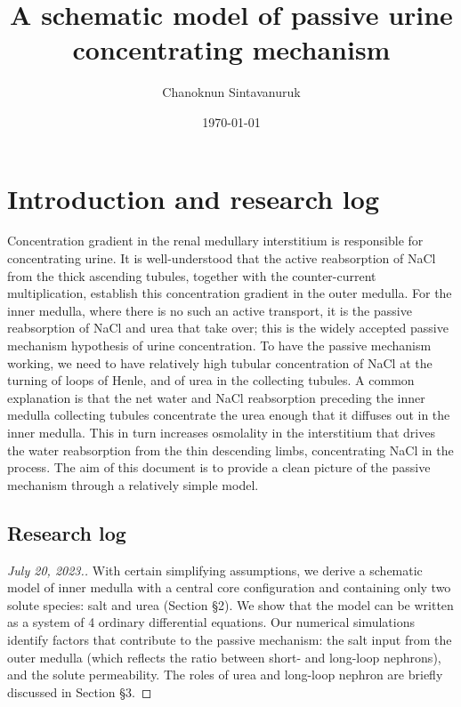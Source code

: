 \documentclass{article}
\title{A schematic model of passive urine concentrating mechanism}
\author[1]{Chanoknun Sintavanuruk}
\date{\today}
\numberwithin{equation}{section} %
\begin{document}
\sloppy %
\maketitle

\section{Introduction and research log}

Concentration gradient in the renal medullary interstitium is responsible for concentrating urine.
It is well-understood that the active reabsorption of NaCl from the thick ascending tubules, together with the counter-current multiplication, establish this concentration gradient in the outer medulla.
For the inner medulla, where there is no such an active transport, it is the passive reabsorption of NaCl and urea that take over; this is the widely accepted passive mechanism hypothesis of urine concentration.
To have the passive mechanism working, we need to have relatively high tubular concentration of NaCl at the turning of loops of Henle, and of urea in the collecting tubules.
A common explanation is that the net water and NaCl reabsorption preceding the inner medulla collecting tubules concentrate the urea enough that it diffuses out in the inner medulla.
This in turn increases osmolality in the interstitium that drives the water reabsorption from the thin descending limbs, concentrating NaCl in the process.
The aim of this document is to provide a clean picture of the passive mechanism through a relatively simple model.

\subsection{Research log}

\begin{proof}[July 20, 2023.]
    With certain simplifying assumptions, we derive a schematic model of inner medulla with a central core configuration and containing only two solute species: salt and urea (Section \S2).
    We show that the model can be written as a system of 4 ordinary differential equations.
    Our numerical simulations identify factors that contribute to the passive mechanism: the salt input from the outer medulla (which reflects the ratio between short- and long-loop nephrons), and the solute permeability.
    The roles of urea and long-loop nephron are briefly discussed in Section \S3.
\end{proof}
\end{document}
